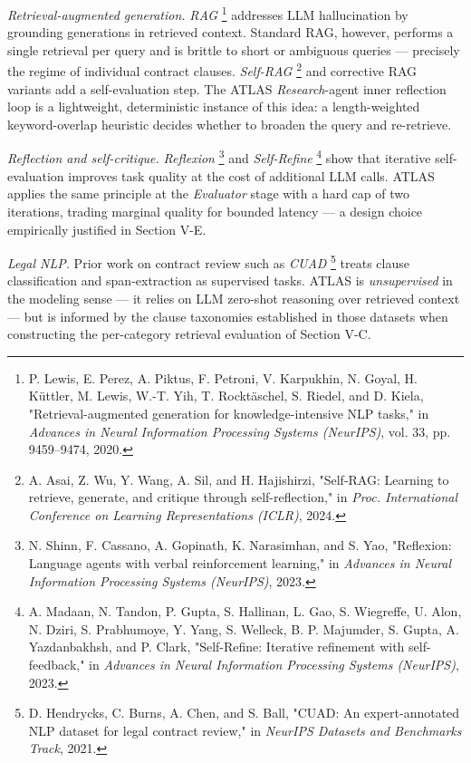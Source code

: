 \documentclass[
  twocolumn]{article}
\begin{document}
\emph{Retrieval-augmented generation.} \emph{RAG} \footnote{P. Lewis, E.
  Perez, A. Piktus, F. Petroni, V. Karpukhin, N. Goyal, H. Küttler, M.
  Lewis, W.-T. Yih, T. Rocktäschel, S. Riedel, and D. Kiela,
  "Retrieval-augmented generation for knowledge-intensive NLP tasks," in
  \emph{Advances in Neural Information Processing Systems (NeurIPS)},
  vol. 33, pp. 9459--9474, 2020.} addresses LLM hallucination by
grounding generations in retrieved context. Standard RAG, however,
performs a single retrieval per query and is brittle to short or
ambiguous queries --- precisely the regime of individual contract
clauses. \emph{Self-RAG} \footnote{A. Asai, Z. Wu, Y. Wang, A. Sil, and
  H. Hajishirzi, "Self-RAG: Learning to retrieve, generate, and critique
  through self-reflection," in \emph{Proc. International Conference on
  Learning Representations (ICLR)}, 2024.} and corrective RAG variants
add a self-evaluation step. The ATLAS \emph{Research}-agent inner
reflection loop is a lightweight, deterministic instance of this idea: a
length-weighted keyword-overlap heuristic decides whether to broaden the
query and re-retrieve.

\emph{Reflection and self-critique.} \emph{Reflexion} \footnote{N.
  Shinn, F. Cassano, A. Gopinath, K. Narasimhan, and S. Yao, "Reflexion:
  Language agents with verbal reinforcement learning," in \emph{Advances
  in Neural Information Processing Systems (NeurIPS)}, 2023.} and
\emph{Self-Refine} \footnote{A. Madaan, N. Tandon, P. Gupta, S.
  Hallinan, L. Gao, S. Wiegreffe, U. Alon, N. Dziri, S. Prabhumoye, Y.
  Yang, S. Welleck, B. P. Majumder, S. Gupta, A. Yazdanbakhsh, and P.
  Clark, "Self-Refine: Iterative refinement with self-feedback," in
  \emph{Advances in Neural Information Processing Systems (NeurIPS)},
  2023.} show that iterative self-evaluation improves task quality at
the cost of additional LLM calls. ATLAS applies the same principle at
the \emph{Evaluator} stage with a hard cap of two iterations, trading
marginal quality for bounded latency --- a design choice empirically
justified in Section V-E.

\emph{Legal NLP.} Prior work on contract review such as \emph{CUAD}
\footnote{D. Hendrycks, C. Burns, A. Chen, and S. Ball, "CUAD: An
  expert-annotated NLP dataset for legal contract review," in
  \emph{NeurIPS Datasets and Benchmarks Track}, 2021.} treats clause
classification and span-extraction as supervised tasks. ATLAS is
\emph{unsupervised} in the modeling sense --- it relies on LLM zero-shot
reasoning over retrieved context --- but is informed by the clause
taxonomies established in those datasets when constructing the
per-category retrieval evaluation of Section V-C.
\end{document}
